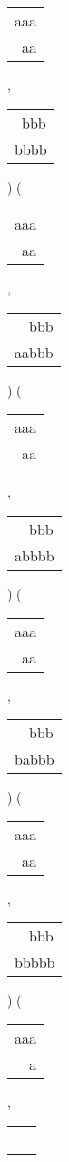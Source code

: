 \begin{description}
\begin{tabular}{|l|}
aaa \\
\ aa \\
\hline
\end{tabular} 
 , 
\begin{tabular}{|l|} \hline
\ bbb \\
bbbb \\
\hline
\end{tabular} 
) 
 ( 
\begin{tabular}{|l|} \hline
aaa \\
\ aa \\
\hline
\end{tabular} 
 , 
\begin{tabular}{|l|} \hline
\ \ bbb \\
aabbb \\
\hline
\end{tabular} 
) 
 ( 
\begin{tabular}{|l|} \hline
aaa \\
\ aa \\
\hline
\end{tabular} 
 , 
\begin{tabular}{|l|} \hline
\ \ bbb \\
abbbb \\
\hline
\end{tabular} 
) 
 ( 
\begin{tabular}{|l|} \hline
aaa \\
\ aa \\
\hline
\end{tabular} 
 , 
\begin{tabular}{|l|} \hline
\ \ bbb \\
babbb \\
\hline
\end{tabular} 
) 
 ( 
\begin{tabular}{|l|} \hline
aaa \\
\ aa \\
\hline
\end{tabular} 
 , 
\begin{tabular}{|l|} \hline
\ \ bbb \\
bbbbb \\
\hline
\end{tabular} 
) 
 ( 
\begin{tabular}{|l|} \hline
aaa \\
\ \ a \\
\hline
\end{tabular} 
 , 
\begin{tabular}{|l|} \hline
\ \  \\

\end{tabular}
\end{description}

